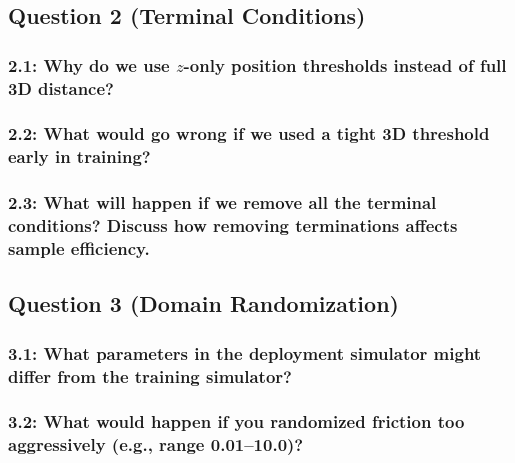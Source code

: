 \documentclass[12pt]{article}
\begin{document}
\subsection*{Question 2 (Terminal Conditions)}

\subsubsection*{2.1: Why do we use $z$-only position thresholds instead of full 3D distance?}
\begin{solution}[height=7cm]
\end{solution}

\subsubsection*{2.2: What would go wrong if we used a tight 3D threshold early in training?}
\begin{solution}[height=7cm]
\end{solution}

\subsubsection*{2.3: What will happen if we remove all the terminal conditions? Discuss how removing terminations affects sample efficiency.}
\begin{solution}[height=7cm]
\end{solution}

\subsection*{Question 3 (Domain Randomization)}

\subsubsection*{3.1: What parameters in the deployment simulator might differ from the training simulator?}
\begin{solution}[height=7cm]
\end{solution}

\subsubsection*{3.2: What would happen if you randomized friction too aggressively (e.g., range 0.01--10.0)?}
\begin{solution}[height=7cm]
\end{solution}
\end{document}
